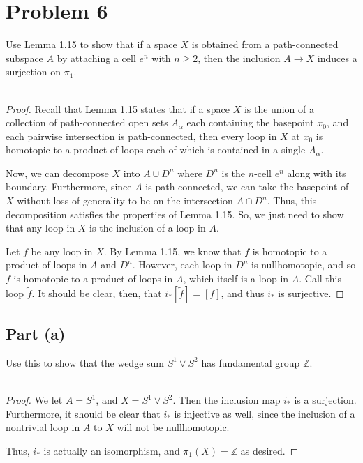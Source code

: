 \documentclass[fontsize=11pt]{scrartcl} %
\numberwithin{equation}{section} %
\numberwithin{figure}{section} %
\numberwithin{table}{section} %
\newcommand{\Z}{\mathbb{Z}}
\begin{document}
\newpage
\section*{Problem 6}
Use Lemma 1.15 to show that if a space $X$ is obtained from a path-connected
subspace $A$ by attaching a cell $e^n$ with $n\geq 2$, then the inclusion $A\to
X$ induces a surjection on $\pi_1$.
\\
\\
\begin{proof}
    Recall that Lemma 1.15 states that if a space $X$ is the union of a
    collection of path-connected open sets $A_{\alpha}$ each containing the
    basepoint $x_0$, and each pairwise intersection is path-connected, then
    every loop in $X$ at $x_0$ is homotopic to a product of loops each of which
    is contained in a single $A_{\alpha}$.

    Now, we can decompose $X$ into $A\cup D^n$ where $D^n$ is the $n$-cell $e^n$
    along with its boundary. Furthermore, since $A$ is path-connected, we can
    take the basepoint of $X$ without loss of generality to be on the
    intersection $A\cap D^n$. Thus, this decomposition satisfies the properties
    of Lemma 1.15. So, we just need to show that any loop in $X$ is the
    inclusion of a loop in $A$.

    Let $f$ be any loop in $X$. By Lemma 1.15, we know that $f$ is homotopic to
    a product of loops in $A$ and $D^n$. However, each loop in $D^n$ is
    nullhomotopic, and so $f$ is homotopic to a product of loops in $A$, which
    itself is a loop in $A$. Call this loop $\tilde{f}$. It should be clear,
    then, that $i_*[\tilde{f}] = [f]$, and thus $i_*$ is surjective.
\end{proof}
\subsection*{Part (a)}
Use this to show that the wedge sum $S^1\vee S^2$ has fundamental group $\Z$.
\\
\\
\begin{proof}
    We let $A=S^1$, and $X=S^1\vee S^2$. Then the inclusion map $i_*$ is a
    surjection. Furthermore, it should be clear that $i_*$ is injective as well,
    since the inclusion of a nontrivial loop in $A$ to $X$ will not be
    nullhomotopic.
    
    Thus, $i_*$ is actually an isomorphism, and $\pi_1(X) = \Z$ as desired.
\end{proof}
\end{document}
